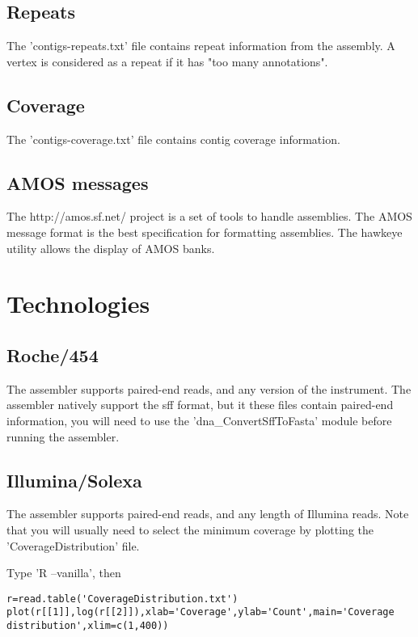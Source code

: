 \documentclass{article}
\begin{document}
\subsection{Repeats}

The 'contigs-repeats.txt' file contains repeat information from the assembly.
A vertex is considered as a repeat if it has "too many annotations".

\subsection{Coverage}

The 'contigs-coverage.txt' file  contains contig coverage information.

\subsection{AMOS messages}

The http://amos.sf.net/ project is a set of tools to handle assemblies.
The AMOS message format is the best specification for formatting assemblies.
The hawkeye utility allows the display of AMOS banks.

\section{Technologies}
\subsection{Roche/454}

The assembler supports paired-end reads, and any version of the instrument.
The assembler natively support the sff format, but it these files contain
paired-end information, you will need to use the 'dna\_ConvertSffToFasta' module 
before running the assembler.

\subsection{Illumina/Solexa}

The assembler supports paired-end reads, and any length of Illumina reads.
Note that you will usually need to select the minimum coverage by plotting
the 'CoverageDistribution' file.

Type 'R --vanilla', then
\begin{verbatim}
r=read.table('CoverageDistribution.txt')
plot(r[[1]],log(r[[2]]),xlab='Coverage',ylab='Count',main='Coverage distribution',xlim=c(1,400))
\end{verbatim}
\end{document}
